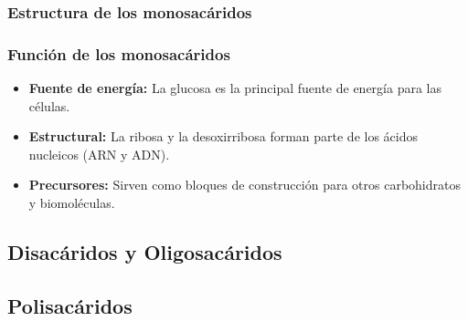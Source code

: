 
\subsubsection{Estructura de los monosacáridos}

\subsubsection{Función de los monosacáridos}
\begin{itemize}
    \item \textbf{Fuente de energía:} La glucosa es la principal fuente de energía para las células.
    \item \textbf{Estructural:} La ribosa y la desoxirribosa forman parte de los ácidos nucleicos (ARN y ADN).
    \item \textbf{Precursores:} Sirven como bloques de construcción para otros carbohidratos y biomoléculas.
\end{itemize}


\subsection{Disacáridos y Oligosacáridos}


\subsection{Polisacáridos}

